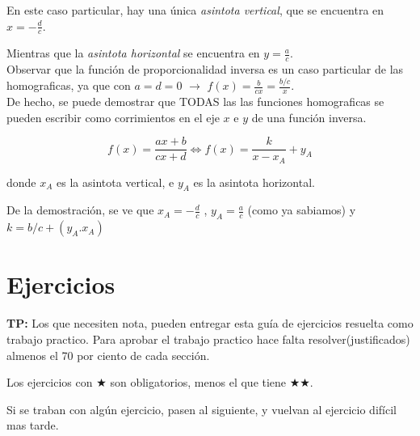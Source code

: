 \documentclass[a4paper,11pt,spanish,sans]{exam}
\begin{document}
En este caso particular, hay una única \textit{asintota vertical}, que se encuentra en $x=-\frac{d}{c}$.
 
Mientras que la \textit{asintota horizontal} se encuentra en $y=\frac{a}{c}$.\\

Observar que la función de proporcionalidad inversa es un caso particular de las homograficas, ya que con $a=d=0$ $\longrightarrow$ $f(x) = \frac{b}{c x}=\frac{b/c}{x}$.\\

De hecho, se puede demostrar que TODAS las  las funciones homograficas se pueden escribir como corrimientos en el eje $x$ e $y$ de una función inversa.

\[f(x) = \frac{a x + b}{c x + d}  \Longleftrightarrow  f(x)=\frac{k}{x-x_A}+y_A \]
\begin{flushright}
donde $x_A$ es la asintota vertical, e $y_A$ es la asintota horizontal. 
\end{flushright}

De la demostración, se ve que $x_A=-\frac{d}{c}$ , $y_A=\frac{a}{c}$ (como ya sabiamos) y $k=b/c+(y_A.x_A)$
\section*{Ejercicios}

\textbf{TP:} Los que necesiten nota, pueden entregar esta guía de ejercicios resuelta como trabajo practico. Para aprobar el trabajo practico hace falta resolver(justificados) almenos el 70 por ciento de cada sección. 

Los ejercicios con $\bigstar $ son obligatorios, menos el que tiene $\bigstar \bigstar$.


Si se traban con algún ejercicio, pasen al siguiente, y vuelvan al ejercicio difícil mas tarde.
\end{document}
